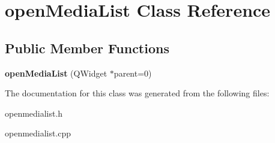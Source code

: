 \hypertarget{classopen_media_list}{\section{open\-Media\-List \-Class \-Reference}
\label{classopen_media_list}
}
\subsection*{\-Public \-Member \-Functions}
\begin{DoxyCompactItemize}
\item 
\hypertarget{classopen_media_list_a7ff44efabb7bcfa26e582e7975a6cf85}{{\bfseries open\-Media\-List} (\-Q\-Widget $\ast$parent=0)}\label{classopen_media_list_a7ff44efabb7bcfa26e582e7975a6cf85}

\end{DoxyCompactItemize}


\-The documentation for this class was generated from the following files\-:\begin{DoxyCompactItemize}
\item 
openmedialist.\-h\item 
openmedialist.\-cpp\end{DoxyCompactItemize}
